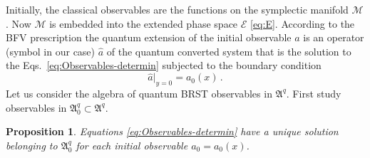 \documentclass[a4paper,11pt,oneside]{amsart}
\theoremstyle{plain}
\numberwithin{equation}{section} %
\numberwithin{figure}{section} %
\newtheorem{fact}{Proposition}[section]
\def\manM{{\mathcal M}}
\def\aA{{ \mathfrak A}}
\def\E{{ \mathcal E}}
\begin{document}
\noindent
Initially, the classical observables are the functions
on the symplectic manifold $\manM$.  Now $\manM$ is embedded
into the extended phase space $\E$ \eqref{eq:E}.  According to the
BFV prescription the quantum extension of the
initial observable $a$ is an operator (symbol in our case)
$\hat a$ of the quantum converted system that is the solution
to the Eqs.~\eqref{eq:Observables-determin}
subjected to the boundary condition
\begin{equation}
\label{eq:bc}
{\hat a}|_{y=0}=a_0(x)\,.
\end{equation}
Let us consider the algebra of quantum BRST observables in
$\aA^q$. First study observables in $\aA^q_0 \subset \aA^q$.
\begin{fact}
\label{fact:observ-existence}
Equations \eqref{eq:Observables-determin} have a unique solution
belonging to $\aA_0^q$ for each initial observable $a_0=a_0(x)$.
\end{fact}
\end{document}
